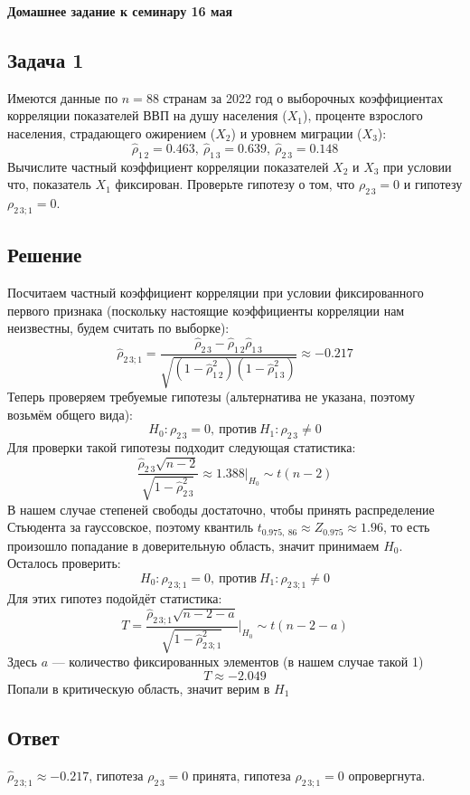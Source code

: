 \documentclass[12pt, a4paper]{article}
\begin{document}
\begin{center}
    \bf Домашнее задание к семинару 16 мая
\end{center}
\subsection*{Задача 1}
Имеются данные по $n = 88$ странам за 2022 год о выборочных коэффициентах корреляции показателей ВВП на душу населения  ($X_1$), проценте взрослого населения, страдающего ожирением ($X_2$) и уровнем миграции ($X_3$):
\[
\hat \rho_{1\, 2} = 0.463,\ \hat \rho_{1\, 3}=0.639,\ \hat \rho_{2\,3}=0.148
\]
Вычислите частный коэффициент корреляции показателей $X_2$ и $X_3$ при условии что, показатель $X_1$ фиксирован. Проверьте гипотезу о том, что $\rho_{2\, 3}=0$ и гипотезу $\rho_{2\,3; 1}=0$.
\subsection*{Решение}
Посчитаем частный коэффициент корреляции при условии фиксированного первого признака (поскольку настоящие коэффициенты корреляции нам неизвестны, будем считать по выборке):
\[
\hat \rho_{2\, 3; 1} = \frac{ \hat \rho_{2\, 3} - \hat \rho_{1\, 2} \hat \rho_{1\, 3} }{\sqrt{\left( 1 - \hat \rho_{1\, 2} ^2\right) \left( 1 - \hat \rho_{1\, 3}^2 \right)}} \approx -0.217
\]
Теперь проверяем требуемые гипотезы (альтернатива не указана, поэтому возьмём общего вида):
\[
H_0: \rho_{2\, 3} = 0,\ \text{против}\ H_1: \rho_{2\, 3} \neq 0
\]
Для проверки такой гипотезы подходит следующая статистика:
\[
\frac{\hat \rho_{2\, 3} \sqrt{n - 2} }{\sqrt{1 - \hat \rho_{2\, 3}^2}} \approx 1.388 \Bigg|_{H_0} \sim t(n - 2)
\]
В нашем случае степеней свободы достаточно, чтобы принять распределение Стьюдента за гауссовское, поэтому квантиль $t_{0.975,\ 86} \approx Z_{0.975} \approx 1.96$, то есть произошло попадание в доверительную область, значит принимаем $H_0$.\\
Осталось проверить:
\[
H_0: \rho_{2\, 3; 1} = 0,\ \text{против}\ H_1: \rho_{2\, 3; 1} \neq 0
\]
Для этих гипотез подойдёт статистика:
\[
T = \frac{\hat \rho_{2\, 3; 1} \sqrt{n - 2 - a}}{\sqrt{1 - \hat \rho^2_{2\, 3; 1}}} \Bigg|_{H_0} \sim t(n - 2 - a)
\]
Здесь $a$ --- количество фиксированных элементов (в нашем случае такой 1)
\[
T \approx -2.049
\]
Попали в критическую область, значит верим в $H_1$
\subsection*{Ответ}
$\hat \rho_{2\, 3; 1} \approx -0.217$, гипотеза $\rho_{2\, 3} = 0$ принята, гипотеза $\rho_{2\, 3; 1} = 0$ опровергнута.
\end{document}
